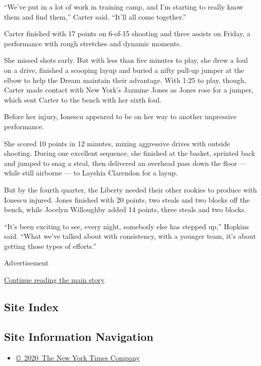 ``We've put in a lot of work in training camp, and I'm starting to
really know them and find them,'' Carter said. ``It'll all come
together.''

Carter finished with 17 points on 6-of-15 shooting and three assists on
Friday, a performance with rough stretches and dynamic moments.

She missed shots early. But with less than five minutes to play, she
drew a foul on a drive, finished a scooping layup and buried a nifty
pull-up jumper at the elbow to help the Dream maintain their advantage.
With 1:25 to play, though, Carter made contact with New York's Jazmine
Jones as Jones rose for a jumper, which sent Carter to the bench with
her sixth foul.

Before her injury, Ionescu appeared to be on her way to another
impressive performance.

She scored 10 points in 12 minutes, mixing aggressive drives with
outside shooting. During one excellent sequence, she finished at the
basket, sprinted back and jumped to snag a steal, then delivered an
overhead pass down the floor --- while still airborne --- to Layshia
Clarendon for a layup.

But by the fourth quarter, the Liberty needed their other rookies to
produce with Ionescu injured. Jones finished with 20 points, two steals
and two blocks off the bench, while Jocelyn Willoughby added 14 points,
three steals and two blocks.

``It's been exciting to see, every night, somebody else has stepped
up,'' Hopkins said. ``What we've talked about with consistency, with a
younger team, it's about getting those types of efforts.''

Advertisement

\protect\hyperlink{after-bottom}{Continue reading the main story}

\hypertarget{site-index}{%
\subsection{Site Index}\label{site-index}}

\hypertarget{site-information-navigation}{%
\subsection{Site Information
Navigation}\label{site-information-navigation}}

\begin{itemize}
\tightlist
\item
  \href{https://help.nytimes3xbfgragh.onion/hc/en-us/articles/115014792127-Copyright-notice}{©~2020~The
  New York Times Company}
\end{itemize}

